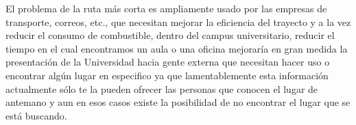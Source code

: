     El problema de la ruta más corta es ampliamente usado por las empresas de transporte, correos, etc., que necesitan mejorar la eficiencia del trayecto y a la vez reducir el consumo de combustible, dentro del campus universitario, reducir el tiempo en el cual encontramos un aula o una oficina mejoraría en gran medida la presentación de la Universidad hacia gente externa que necesitan hacer uso o encontrar algún lugar en especifico ya que lamentablemente esta información actualmente sólo te la pueden ofrecer las personas que conocen el lugar de antemano y aun en esos casos existe la posibilidad de no encontrar el lugar que se está buscando.\\























